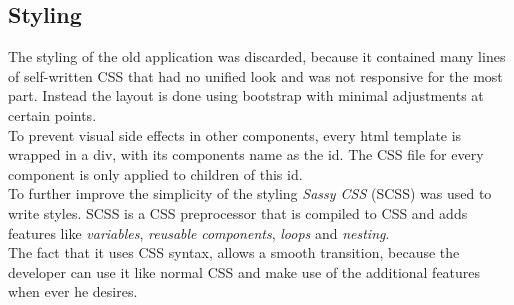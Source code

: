 \subsection{Styling}
\label{sec:styling}
The styling of the old application was discarded, because it contained many lines of self-written CSS that had no unified look and was not responsive for the most part. Instead the layout is done using bootstrap with minimal adjustments at certain points.\\
To prevent visual side effects in other components, every html template is wrapped in a div, with its components name as the id. The CSS file for every component is only applied to children of this id.\\
To further improve the simplicity of the styling \textit{Sassy CSS} (SCSS) was used to write styles. SCSS is a CSS preprocessor that is compiled to CSS and adds features like \textit{variables}, \textit{reusable} \textit{components}, \textit{loops} and \textit{nesting}.\\
The fact that it uses CSS syntax, allows a smooth transition, because the developer can use it like normal CSS and make use of the additional features when ever he desires.

